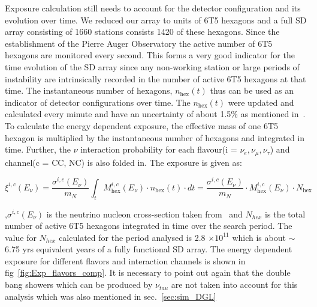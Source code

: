 Exposure calculation still needs to account for the detector configuration and its evolution over time. We reduced our array to units of 6T5 hexagons and a full SD array consisting of 1660 stations consists 1420 of these hexagons. Since the establishment of the Pierre Auger Observatory the active number of 6T5 hexagons are monitored every second. This forms a very good indicator for the time evolution of the SD array since any non-working station or large periods of instability are intrinsically recorded in the number of active 6T5 hexagons at that time. The instantaneous number of hexagons, $n_{\text{hex}}(t)$ thus can be used as an indicator of detector configurations over time. The $n_{\text{hex}}(t)$ were updated and calculated every minute and have an uncertainty of about 1.5\% as mentioned in~\cite{PierreAuger:2010zof}. To calculate the energy dependent exposure, the effective mass of one 6T5 hexagon is multiplied by the instantaneous number of hexagons and integrated in time. Further, the $\nu$ interaction probability for each flavour(i = $\nu_e, \nu_{\mu}, \nu_{\tau}$) and channel(c = CC, NC) is also folded in. The exposure is given as:

\begin{equation}
  \xi^{i,c}(E_{\nu}) = \frac{\sigma^{i,c}(E_{\nu})}{m_N} \int_{t} M_{\text{hex}}^{i,c}(E_{\nu}) \cdot n_{\text{hex}}(t) \cdot dt =  \frac{\sigma^{i,c}(E_{\nu})}{m_N} \cdot M_{\text{hex}}^{i,c}(E_{\nu}) \cdot N_{\text{hex}}
\end{equation}

,$\sigma^{i,c}(E_{\nu})$ is the neutrino nucleon cross-section taken from~\cite{Cooper-Sarkar:2011jtt} and $N_{hex}$ is the total number of active 6T5 hexagons integrated in time over the search period. The value for $N_{hex}$ calculated for the period analysed is 2.8 $\times 10^{11}$ which is about $\sim$6.75 yrs equivalent years of a fully functional SD array. The energy dependent exposure for different flavors and interaction channels is shown in fig~\ref{fig:Exp_flavors_comp}. It is necessary to point out again that the double bang showers which can be produced by $\nu_{tau}$ are not taken into account for this analysis which was also mentioned in sec.~\ref{sec:sim_DGL} 

